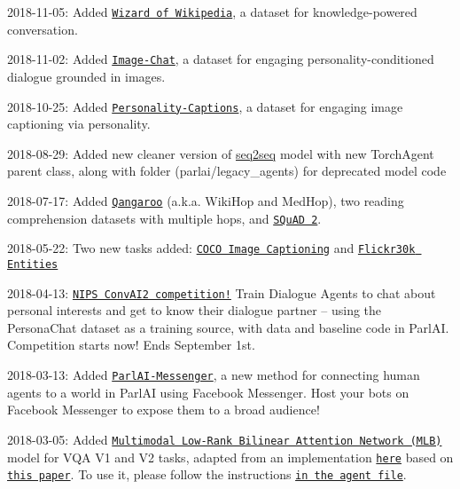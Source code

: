 2018-\/11-\/05\+: Added \href{http://parl.ai/projects/wizard_of_wikipedia/}{\tt Wizard of Wikipedia}, a dataset for knowledge-\/powered conversation.

2018-\/11-\/02\+: Added \href{https://klshuster.github.io/image_chat/}{\tt Image-\/\+Chat}, a dataset for engaging personality-\/conditioned dialogue grounded in images.

2018-\/10-\/25\+: Added \href{https://arxiv.org/abs/1810.10665}{\tt Personality-\/\+Captions}, a dataset for engaging image captioning via personality.

2018-\/08-\/29\+: Added new cleaner version of \hyperlink{namespaceseq2seq}{seq2seq} model with new Torch\+Agent parent class, along with folder (parlai/legacy\+\_\+agents) for deprecated model code

2018-\/07-\/17\+: Added \href{http://qangaroo.cs.ucl.ac.uk/}{\tt Qangaroo} (a.\+k.\+a. Wiki\+Hop and Med\+Hop), two reading comprehension datasets with multiple hops, and \href{https://rajpurkar.github.io/SQuAD-explorer/}{\tt S\+Qu\+AD 2}.

2018-\/05-\/22\+: Two new tasks added\+: \href{http://cocodataset.org/#captions-2015}{\tt C\+O\+CO Image Captioning} and \href{http://web.engr.illinois.edu/~bplumme2/Flickr30kEntities/}{\tt Flickr30k Entities}

2018-\/04-\/13\+: \href{http://convai.io/}{\tt N\+I\+PS Conv\+A\+I2 competition!} Train Dialogue Agents to chat about personal interests and get to know their dialogue partner -- using the Persona\+Chat dataset as a training source, with data and baseline code in Parl\+AI. Competition starts now! Ends September 1st.

2018-\/03-\/13\+: Added \href{http://parl.ai/static/docs/messenger.html}{\tt Parl\+A\+I-\/\+Messenger}, a new method for connecting human agents to a world in Parl\+AI using Facebook Messenger. Host your bots on Facebook Messenger to expose them to a broad audience!

2018-\/03-\/05\+: Added \href{https://github.com/facebookresearch/ParlAI/blob/master/parlai/agents/mlb_vqa/mlb_vqa.py}{\tt Multimodal Low-\/\+Rank Bilinear Attention Network (M\+LB)} model for V\+QA V1 and V2 tasks, adapted from an implementation \href{https://github.com/Cadene/vqa.pytorch}{\tt here} based on \href{https://arxiv.org/abs/1610.04325}{\tt this paper}. To use it, please follow the instructions \href{https://github.com/facebookresearch/ParlAI/blob/master/parlai/agents/mlb_vqa/mlb_vqa.py}{\tt in the agent file}.

